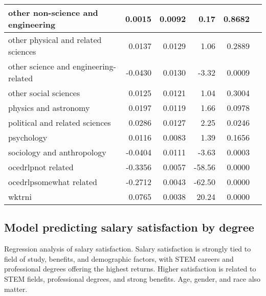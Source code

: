 \documentclass[12pt]{article}
\begin{document}
\begin{table}[H]
\begin{tabular}{|l|r|r|r|r|r|}
  other non-science and engineering & 0.0015 & 0.0092 & 0.17 & 0.8682 \\  \hline
  other physical and related sciences & 0.0137 & 0.0129 & 1.06 & 0.2889 \\  \hline
  other science and engineering-related & -0.0430 & 0.0130 & -3.32 & 0.0009 \\  \hline
  other social sciences & 0.0125 & 0.0121 & 1.04 & 0.3004 \\  \hline
  physics and astronomy & 0.0197 & 0.0119 & 1.66 & 0.0978 \\  \hline
  political and related sciences & 0.0286 & 0.0127 & 2.25 & 0.0246 \\  \hline
  psychology & 0.0116 & 0.0083 & 1.39 & 0.1656 \\  \hline
  sociology and anthropology & -0.0404 & 0.0111 & -3.63 & 0.0003 \\  \hline
  ocedrlpnot related & -0.3356 & 0.0057 & -58.56 & 0.0000 \\  \hline
  ocedrlpsomewhat related & -0.2712 & 0.0043 & -62.50 & 0.0000 \\  \hline
  wktrni & 0.0765 & 0.0038 & 20.24 & 0.0000 \\  \hline
   \hline
\end{tabular}
\label{tab:Job_sat_Regression}
\end{table}

\subsection{Model predicting salary satisfaction by degree}
    Regression analysis of salary satisfaction. Salary satisfaction is strongly tied to field of study, benefits, and demographic factors, with STEM careers and professional degrees offering the highest returns. Higher satisfaction is related to STEM fields, professional degrees, and strong benefits. Age, gender, and race also matter.
     
\end{document}
